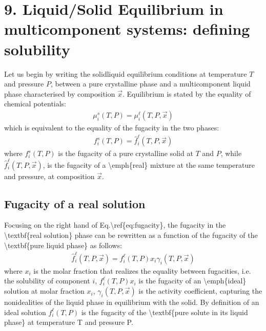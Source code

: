 \documentclass[letterpaper,10pt,english]{jupyterBook}
\begin{document}
\section{9. Liquid/Solid Equilibrium in multicomponent systems: defining solubility}
\label{\detokenize{Solubility:liquid-solid-equilibrium-in-multicomponent-systems-defining-solubility}}\label{\detokenize{Solubility::doc}}
\sphinxAtStartPar
Let us begin by writing the solid\sphinxhyphen{}liquid equilibrium conditions at temperature \(T\) and pressure \(P\), between a pure crystalline phase and a multicomponent liquid phase characterised by composition \(\vec{x}\).
Equilibrium is stated by the equality of chemical potentials:
\begin{equation*}
\begin{split}
\mu_i^s(T,P)=\mu_i^\ell(T,P,\vec{x})
\end{split}
\end{equation*}
\sphinxAtStartPar
which is equivalent to the equality of the fugacity in the two phases:
\begin{equation*}
\begin{split}
f_i^s(T,P)=\hat{f}_i^\ell(T,P,\vec{x})
\end{split}
\end{equation*}
\sphinxAtStartPar
where \(f_i^s(T,P)\) is the fugacity of a pure crystalline solid at \(T\) and \(P\), while \(\hat{f}_i^\ell(T,P,\vec{x})\), is the fugacity of a \textbackslash{}emph\{real\} mixture at the same temperature and pressure, at composition \(\vec{x}\).


\subsection{Fugacity of a real solution}
\label{\detokenize{Solubility:fugacity-of-a-real-solution}}
\sphinxAtStartPar
Focusing on the right hand of Eq.\textbackslash{}ref\{eq:fugacity\}, the fugacity in the \textbackslash{}textbf\{real solution\} phase can be rewritten as a function of the fugacity of the \textbackslash{}textbf\{pure liquid phase\} as follows:
\begin{equation*}
\begin{split}
\hat{f}_i^\ell(T,P,\vec{x})=f_i^\ell(T,P)x_i\gamma_i(T,P,\vec{x})
\end{split}
\end{equation*}
\sphinxAtStartPar
where \(x_i\) is the molar fraction that realizes the equality between fugacities, i.e. the solubility of component \(i\), \(f_i^\ell(T,P)x_i\) is the fugacity of an \textbackslash{}emph\{ideal\} solution at molar fraction \(x_i\), \(\gamma_i(T,P,\vec{x})\) is the activity coefficient, capturing the non\sphinxhyphen{}idealities of the liquid phase in equilibrium with the solid. By definition of an ideal solution \(f_i^\ell(T,P)\) is the fugacity of the \textbackslash{}textbf\{pure solute in its liquid phase\} at temperature T and pressure P.
\end{document}
